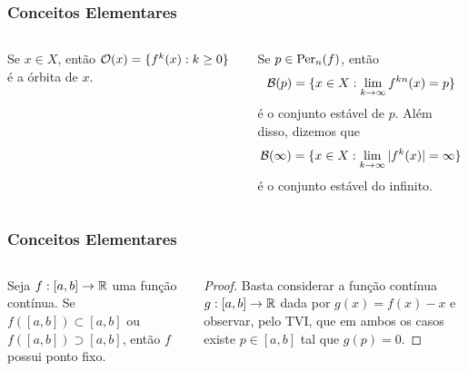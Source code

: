 \begin{frame} 
\vspace{5pt}
\frametitle{Conceitos Elementares}
\begin{columns}
\column{\dimexpr\paperwidth-15pt}

\begin{definition}
Se $x \in X$, então $\mathcal{O}(x) = \lbrace f^k(x) : k \geq 0 \rbrace$ é a órbita de $x$.
\end{definition}

\begin{definition} 
Se $p \in \operatorname{Per}_n(f)$, então
$$\mathcal{B}(p) = \lbrace x \in  X: \lim_{k \to \infty} f^{kn}(x) = p \rbrace$$
é o conjunto estável de $p$. Além disso, dizemos que
$$\mathcal{B}(\infty) = \lbrace x \in  X: \lim_{k \to \infty} |f^k(x)| = \infty \rbrace$$
é o conjunto estável do infinito.
\end{definition}

\end{columns}
\end{frame}


\begin{frame}
\vspace{5pt}
\frametitle{Conceitos Elementares}
\begin{columns}
\column{\dimexpr\paperwidth-15pt}

\begin{proposition}
Seja $f: [a, b] \to \mathbb{R}$ uma função contínua. Se $f([a, b]) \subset [a, b]$ ou $f([a, b]) \supset [a, b]$, então $f$ possui ponto fixo.
\end{proposition}

\begin{proof}
Basta considerar a função contínua $g: [a, b] \to \mathbb{R}$ dada por $g(x) = f(x) - x$ e observar, pelo TVI, que em ambos os casos existe $p \in [a, b]$ tal que $g(p) = 0$.
\end{proof}

\end{columns}
\end{frame}


